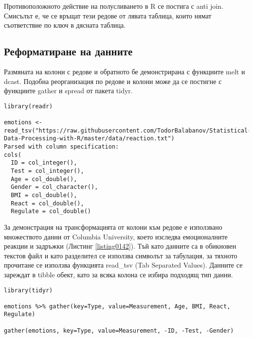 Противоположното действие на полусливането в R се постига с anti join. Смисълът е, че се връщат тези редове от лявата таблица, които нямат съответствие по ключ в дясната таблица.

\subsection{Реформатиране на данните}

Размяната на колони с редове и обратното бе демонстрирана с функциите melt и dcast. Подобна реорганизация по редове и колони може да се постигне с функциите gather и spread от пакета tidyr.

\begin{lstlisting}[caption=Данни за реакциите, label=listing0142]
library(readr)

emotions <- read_tsv("https://raw.githubusercontent.com/TodorBalabanov/Statistical-Data-Processing-with-R/master/data/reaction.txt")
Parsed with column specification:
cols(
  ID = col_integer(),
  Test = col_integer(),
  Age = col_double(),
  Gender = col_character(),
  BMI = col_double(),
  React = col_double(),
  Regulate = col_double()
\end{lstlisting}

За демонстрация на трансформацията от колони към редове е използвано множеството данни от Columbia University, което изследва емоционалните реакции и задръжки (Листинг \ref{listing0142}). Тъй като данните са в обикновен текстов файл и като разделител се използва символът за табулация, за тяхното прочитане се използва функцията read\_tsv (Tab Separated Values). Данните се зареждат в tibble обект, като за всяка колона се избира подходящ тип данни.

\begin{lstlisting}[caption=Свиване от колони в редове, label=listing0143]
library(tidyr)

emotions %>% gather(key=Type, value=Measurement, Age, BMI, React, Regulate)

gather(emotions, key=Type, value=Measurement, -ID, -Test, -Gender)
\end{lstlisting}

